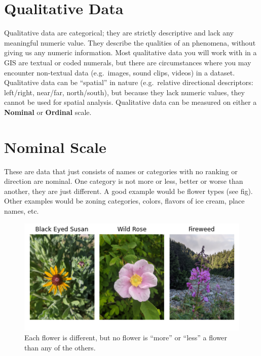 \documentclass[
]{book}
\begin{document}
\hypertarget{qualitative-data}{%
\section{Qualitative Data}\label{qualitative-data}}

Qualitative data are categorical; they are strictly descriptive and lack any meaningful numeric value. They describe the qualities of an phenomena, without giving us any numeric information. Most qualitative data you will work with in a GIS are textual or coded numerals, but there are circumstances where you may encounter non-textual data (e.g.~images, sound clips, videos) in a dataset. Qualitative data can be ``spatial'' in nature (e.g.~relative directional descriptors: left/right, near/far, north/south), but because they lack numeric values, they cannot be used for spatial analysis. Qualitative data can be measured on either a \textbf{Nominal} or \textbf{Ordinal} scale.

\hypertarget{nominal-scale}{%
\section{Nominal Scale}\label{nominal-scale}}

These are data that just consists of names or categories with no ranking or direction are nominal. One category is not more or less, better or worse than another, they are just different. A good example would be flower types (see fig). Other examples would be zoning categories, colors, flavors of ice cream, place names, etc.

\begin{figure}
\centering
\includegraphics{images/03-flowers-nominal.png}
\caption{Each flower is different, but no flower is ``more'' or ``less'' a flower than any of the others.}
\end{figure}
\end{document}
